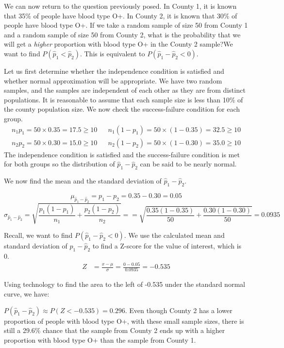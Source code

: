 \begin{examplewrap}
\begin{nexample}{
We can now return to the question previously posed.  In County 1, it is known that 35\% of people have blood type O+.  In County 2, it is known that 30\% of people have blood type O+.  If we take a random sample of size 50 from County 1 and a random sample of size 50 from County 2, what is the probability that we will get a \emph{higher} proportion with blood type O+ in the County 2 sample?}We want to find $P(\hat{p}_1<\hat{p}_2)$.  This is equivalent to $P(\hat{p}_1-\hat{p}_2<0)$. 

Let us first determine whether the independence condition is satisfied and whether normal approximation will be appropriate.  We have two random samples, and the samples are independent of each other as they are from distinct populations.  It is reasonable to assume that each sample size is less than 10\% of the county population size.  We now check the success-failure condition for each group.   
\begin{align*}
n_1 p_1 = 50 \times 0.35 = 17.5\ge 10 &&
    n_1 (1 - p_1) = 50 \times (1-0.35) = 32.5\ge 10\\
n_2 p_2 = 50 \times 0.30 = 15.0\ge 10 &&
    n_2 (1 - p_2) = 50 \times (1-0.30) = 35.0\ge 10
\end{align*}
The independence condition is satisfied and the success-failure condition is met for both groups so the distribution of $\hat{p}_1-\hat{p}_2$ can be said to be nearly normal.  

We now find the mean and the standard deviation of $\hat{p}_1-\hat{p}_2$.  

$$\mu_{\hat{p}_1-\hat{p}_2} = p_1-p_2 = 0.35 - 0.30 = 0.05$$
$$ \sigma_{\hat{p}_1-\hat{p}_2}=  \sqrt{\frac{p_1(1-p_1)}{n_1} + \frac{p_2(1-p_2)}{n_2}}=    =\sqrt{\frac{0.35(1-0.35)}{50} + \frac{0.30(1-0.30)}{50}} = 0.0935$$

Recall, we want to find $P(\hat{p}_1-\hat{p}_2<0)$.  We use the calculated mean and standard deviation of $\hat{p}_1-\hat{p}_2$ to find a Z-score for the value of interest, which is 0.
\begin{align*}
Z &= \frac{x - \mu}{\sigma} = \frac{0 - 0.05}{0.0935}=-0.535
\end{align*}

Using technology to find the area to the left of -0.535 under the standard normal curve, we have:

$P(\hat{p}_1-\hat{p}_2) \approx P(Z < -0.535) = 0.296$.  Even though County 2 has a lower proportion of people with blood type O+, with these small sample sizes, there is still a 29.6\% chance that the sample from County 2 ends up with a higher proportion with blood type O+  than the sample from County 1.
\end{nexample}
\end{examplewrap}


